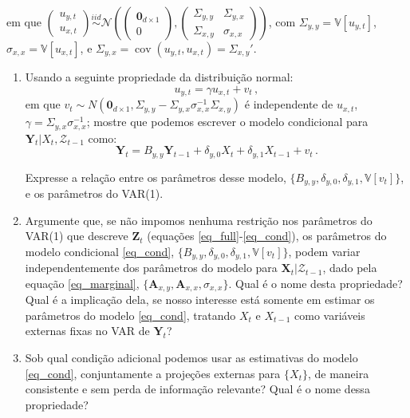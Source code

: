 \documentclass[10pt,a4paper]{article}
\begin{document}
\begin{enumerate}
em que $\begin{pmatrix}
	u_{y,t} \\
	u_{x,t}
	\end{pmatrix} \overset{iid}{\sim} \mathcal{N}\left(\begin{pmatrix}\boldsymbol{0}_{d\times 1} \\ 0\end{pmatrix},\begin{pmatrix}
\Sigma_{y,y} & \Sigma_{y,x} \\
\Sigma_{x,y}& \sigma_{x,x}
	\end{pmatrix}\right)$, com $\Sigma_{y,y} = \mathbb{V}[u_{y,t}]$, $\sigma_{x,x} = \mathbb{V}[u_{x,t}]$, e $\Sigma_{y,x} = \operatorname{cov}(u_{y,t},u_{x,t}) = \Sigma_{x,y}'$.
	
	\begin{enumerate}
		\item Usando a seguinte propriedade da distribuição normal:
		$$u_{y,t} = \gamma u_{x,t} + v_t\, ,$$
		em que $v_t \sim N(\boldsymbol{0}_{d\times 1}, \Sigma_{y,y} - \Sigma_{y,x}\sigma_{x,x}^{-1}\Sigma_{x,y})$ é independente de $u_{x,t}$, $\gamma = \Sigma_{y,x}\sigma_{x,x}^{-1}$; mostre que podemos escrever o modelo condicional para $\boldsymbol{Y}_t|X_t,\mathcal{Z}_{t-1}$ como:
	\begin{equation}
		\label{eq_cond}
		\boldsymbol{Y}_t = {B}_{y,y}\boldsymbol{Y}_{t-1} +\delta_{y,0}X_t + \delta_{y,1} X_{t-1}+ v_{t}\, .
	\end{equation}
	
	Expresse a relação entre os parâmetros desse modelo, $\{B_{y,y}, \delta_{y,0}, \delta_{y,1}, \mathbb{V}[v_t]\}$, e os parâmetros do VAR(1).
	\item Argumente que, se não impomos nenhuma restrição nos parâmetros do VAR(1) que descreve $\boldsymbol{Z}_t$ (equações \eqref{eq_full}-\eqref{eq_cond}), os parâmetros do modelo condicional \eqref{eq_cond},  $\{B_{y,y}, \delta_{y,0}, \delta_{y,1}, \mathbb{V}[v_t]\}$,  podem variar independentemente dos parâmetros do modelo para $\boldsymbol{X}_t|\mathcal{Z}_{t-1}$, dado pela equação \eqref{eq_marginal}, $\{\boldsymbol{A}_{x,y}, \boldsymbol{A}_{x,x}, \sigma_{x,x}\}$. Qual é o nome desta propriedade? Qual é a implicação dela, se nosso interesse está somente em estimar os parâmetros do modelo \eqref{eq_cond}, tratando $X_t$ e $X_{t-1}$ como variáveis externas fixas no VAR de $\boldsymbol{Y}_t$?
	\item Sob qual condição adicional podemos usar as estimativas do modelo \eqref{eq_cond}, conjuntamente a projeções externas para $\{X_t\}$, de maneira consistente e sem perda de informação relevante? Qual é o nome dessa propriedade?
		

\end{enumerate}
\end{enumerate}
\end{document}
